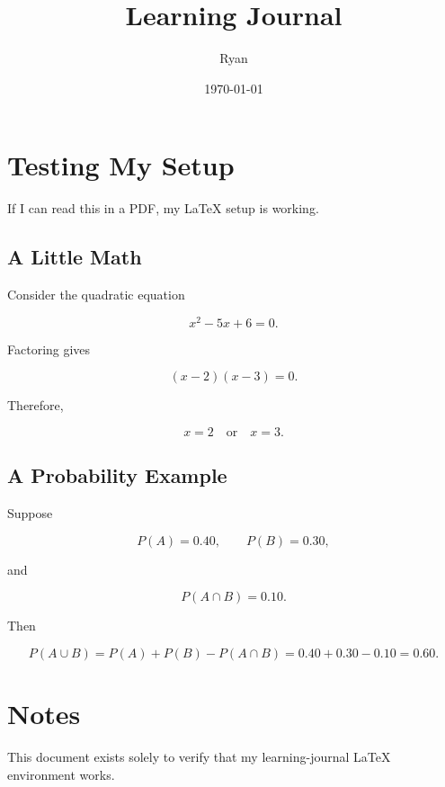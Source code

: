 \documentclass[11pt]{article}
\title{Learning Journal}
\author{Ryan}
\date{\today}
\begin{document}
\maketitle

\section{Testing My Setup}

If I can read this in a PDF, my \LaTeX{} setup is working.

\subsection{A Little Math}

Consider the quadratic equation

\[
x^2 - 5x + 6 = 0.
\]

Factoring gives

\[
(x-2)(x-3)=0.
\]

Therefore,

\[
\boxed{x=2 \quad \text{or} \quad x=3}.
\]

\subsection{A Probability Example}

Suppose

\[
P(A)=0.40, \qquad P(B)=0.30,
\]

and

\[
P(A\cap B)=0.10.
\]

Then

\[
P(A\cup B)
=
P(A)+P(B)-P(A\cap B)
=
0.40+0.30-0.10
=
\boxed{0.60}.
\]

\section{Notes}

This document exists solely to verify that my learning-journal
\LaTeX{} environment works.
\end{document}
